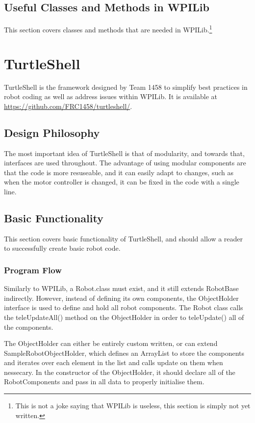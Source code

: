 \documentclass[]{report}
\begin{document}
\section{Useful Classes and Methods in WPILib}
This section covers classes and methods that are needed in WPILib.\footnote{This is not a joke saying that WPILib is useless, this section is simply not yet written.}

\chapter{TurtleShell}
\label{TurtleShell}
TurtleShell is the framework designed by Team 1458 to simplify best practices in robot coding as well as address issues within WPILib.
It is available at \url{https://github.com/FRC1458/turtleshell/}.
\section{Design Philosophy}
The most important idea of TurtleShell is that of modularity, and towards that, interfaces are used throughout.
The advantage of using modular components are that the code is more resuseable, and it can easily adapt to changes, such as when the motor controller is changed, it can be fixed in the code with a single line.


\section{Basic Functionality}
This section covers basic functionality of TurtleShell, and should allow a reader to successfully create basic robot code.

\subsection{Program Flow}
Similarly to WPILib, a Robot.class must exist, and it still extends RobotBase indirectly.
However, instead of defining its own components, the ObjectHolder interface is used to define and hold all robot components.
The Robot class calls the teleUpdateAll() method on the ObjectHolder in order to teleUpdate() all of the components.

The ObjectHolder can either be entirely custom written, or can extend SampleRobotObjectHolder, which defines an ArrayList to store the components and iterates over each element in the list and calls update on them when nessecary.
In the constructor of the ObjectHolder, it should declare all of the RobotComponents and pass in all data to properly initialise them.
\end{document}

